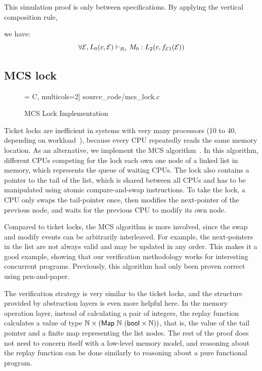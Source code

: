 {This simulation proof is only between specifications.
By applying the vertical composition rule,  we have:
\[
\forall \mathcal{E}, 
L_0(c,\mathcal{E}) \vdash_{R_1} M_0 : L_2(c, f_{\mathcal{E}1}(\mathcal{E}))
\]


\subsection{MCS lock}
\label{sec:con:mcs}
\begin{figure}
 = C, multicols=2] {source_code/mcs_lock.c}
\caption{MCS Lock Implementation}
\label{fig:exp:mcs_lock}
\hrulefill
\end{figure}

Ticket locks are inefficient in systems with very many processors (10
to 40, depending on workload~\cite{Boyd-wickizer12}), because every
CPU repeatedly reads the same memory location. As an alternative, we
implement the MCS algorithm~\cite{mcs91}. In this algorithm,
different CPUs competing for the lock each own one node of a
linked list in memory, which represents the queue of waiting CPUs. The
lock also contains a pointer to the tail of the list, which is shared
between all CPUs and has to be manipulated using atomic
compare-and-swap instructions. To take the lock, a CPU only
swaps the tail-pointer once, then modifies the next-pointer
of the previous node, and waits for the previous CPU to modify its own
node. 

\ignore{
\begin{figure}
 = C, multicols=2] {source_code/mcs_lock.c}
\caption{Pseudocode of MCS-lock implementation.}
\label{fig:exp:mcs_lock}
\end{figure}
}


Compared to ticket locks, the MCS algorithm is more involved, since
the swap and modify events can be arbitrarily interleaved. For
example, the next-pointers in the list are not always valid and may
be updated in any order.  This makes it a good example, showing that
our verification methodology works for interesting concurrent
programs. Previously, this algorithm had only been proven correct
using pen-and-paper.

The verification strategy is very similar to the ticket locks,
and the structure provided by abstraction layers is even more helpful here. In the
memory operation layer, instead of calculating a pair of integers, the
replay function calculates a value of type 
$\integer \times (\mathsf{Map}\ \integer\ (\mathsf{bool}\times \integer))$, that is,
the value of the tail pointer and a finite map representing the list
nodes.  The rest of the proof does not need to concern itself
with a low-level memory model, and reasoning about the
replay function can be done similarly to reasoning about a pure
functional program.

}
